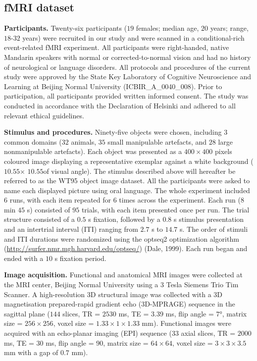 \documentclass[pdflatex,sn-mathphys-num,lineno]{sn-jnl}%
\begin{document}
\begin{CJK}{UTF8}{gbsn}
\subsection{fMRI dataset} 
\textbf{Participants.} Twenty-six participants ($19$ females; median age, $20$ years; range, $18$-$32$ years) were recruited in our study and were scanned in a conditional-rich event-related fMRI experiment. All participants were right-handed, native Mandarin speakers with normal or corrected-to-normal vision and had no history of neurological or language disorders. All protocols and procedures of the current study were approved by the State Key Laboratory of Cognitive Neuroscience and Learning at Beijing Normal University (ICBIR\_A\_0040\_008). Prior to participation, all participants provided written informed consent. The study was conducted in accordance with the Declaration of Helsinki and adhered to all relevant ethical guidelines.

\textbf{Stimulus and procedures.} Ninety-five objects were chosen, including $3$ common domains ($32$ animals, $35$ small manipulable artefacts, and $28$ large nonmanipulable artefacts). Each object was presented as a $400\times400$ pixels coloured image displaying a representative exemplar against a white background ($10.55$\textdegree $\times$ $10.55$\textdegree of visual angle). The stimulus described above will hereafter be referred to as the WT95 object image dataset. All the participants were asked to name each displayed picture using oral language. The whole experiment included $6$ runs, with each item repeated for $6$ times across the experiment. Each run ($8$ min $45$ s) consisted of $95$ trials, with each item presented once per run. The trial structure consisted of a $0.5$ s fixation, followed by a $0.8$ s stimulus presentation and an intertrial interval (ITI) ranging from $2.7$ s to $14.7$ s. The order of stimuli and ITI durations were randomized using the optseq2 optimization algorithm (\url{http://surfer.nmr.mgh.harvard.edu/optseq/}) (Dale, 1999). Each run began and ended with a $10$ s fixation period.

\textbf{Image acquisition.} Functional and anatomical MRI images were collected at the MRI center, Beijing Normal University using a $3$ Tesla Siemens Trio Tim Scanner. A high-resolution 3D structural image was collected with a 3D magnetisation prepared-rapid gradient echo (3D-MPRAGE) sequence in the sagittal plane ($144$ slices, TR = $2530$ ms, TE = $3.39$ ms, flip angle = $7$°, matrix size = $256\times256$, voxel size = $1.33\times 1\times1.33$ mm). Functional images were acquired with an echo-planar imaging (EPI) sequence (33 axial slices, TR = $2000$ ms, TE = $30$ ms, flip angle = $90$\textdegree, matrix size = $64\times64$, voxel size = $3\times3\times3.5$ mm with a gap of $0.7$ mm).


\end{CJK}
\end{document}
